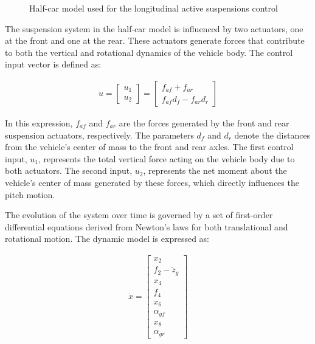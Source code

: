 \documentclass[]{report}
\begin{document}
\begin{figure}[H]
\begin{center}
	\end{center}
	
	\caption{Half-car model used for the longitudinal active suspensions control}
	\label{fig:halfcar_model}
	\end{figure}
	The suspension system in the half-car model is influenced by two actuators, one at the front and one at the rear. These actuators generate forces that contribute to both the vertical and rotational dynamics of the vehicle body. The control input vector is defined as:
	
	
	\begin{align}
		u = \begin{bmatrix}
			u_1 \\
			u_2
		\end{bmatrix} =
		\begin{bmatrix}
			f_{af} + f_{ar} \\
			f_{af} d_f - f_{ar} d_r
		\end{bmatrix}
	\end{align}
	
	In this expression, $f_{af}$ and $f_{ar}$ are the forces generated by the front and rear suspension actuators, respectively. The parameters $d_f$ and $d_r$ denote the distances from the vehicle's center of mass to the front and rear axles. The first control input, $u_1$, represents the total vertical force acting on the vehicle body due to both actuators. The second input, $u_2$, represents the net moment about the vehicle’s center of mass generated by these forces, which directly influences the pitch motion.
	
	
	The evolution of the system over time is governed by a set of first-order differential equations derived from Newton’s laws for both translational and rotational motion. The dynamic model is expressed as:
	
	\begin{align}
		\dot{x} = \begin{bmatrix}
			x_2 \\
			f_2 - \ddot{z}_g \\
			x_4 \\
			f_4 \\
			x_6 \\
			\alpha_{gf} \\
			x_8 \\
			\alpha_{gr}
		\end{bmatrix}
	\end{align}
	
\end{document}
